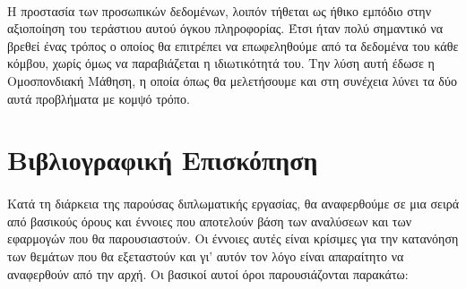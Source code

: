 \paragraph{}Η προστασία των προσωπικών δεδομένων, λοιπόν τήθεται ως ήθικο εμπόδιο στην αξιοποίηση του τεράστιου αυτού όγκου πληροφορίας. Έτσι ήταν πολύ σημαντικό να βρεθεί ένας τρόπος ο οποίος θα επιτρέπει να επωφεληθούμε από τα δεδομένα του κάθε κόμβου, χωρίς όμως να παραβιάζεται η ιδιωτικότητά του. Την λύση αυτή έδωσε η Ομοσπονδιακή Μάθηση, η οποία όπως θα μελετήσουμε και στη συνέχεια λύνει τα δύο αυτά προβλήματα με κομψό τρόπο.

\section{Βιβλιογραφική Επισκόπηση}

\paragraph{}Κατά τη διάρκεια της παρούσας διπλωματικής εργασίας, θα αναφερθούμε σε μια σειρά από βασικούς όρους και έννοιες που αποτελούν βάση των αναλύσεων και των εφαρμογών που θα παρουσιαστούν. Οι έννοιες αυτές είναι κρίσιμες για την κατανόηση των θεμάτων που θα εξεταστούν και γι' αυτόν τον λόγο είναι απαραίτητο να αναφερθούν από την αρχή. Οι βασικοί αυτοί όροι παρουσιάζονται παρακάτω:

